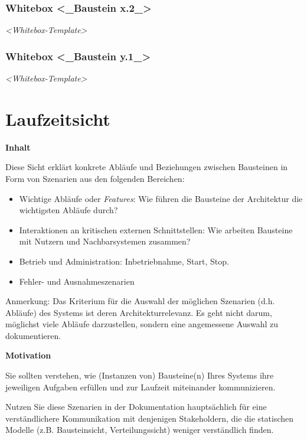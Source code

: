 \documentclass[a4paper,12pt]{article}
\begin{document}
\subsubsection{Whitebox \textless\_Baustein
x.2\_\textgreater{}}\label{_whitebox_baustein_x_2}

\emph{\textless Whitebox-Template\textgreater{}}

\subsubsection{Whitebox \textless\_Baustein
y.1\_\textgreater{}}\label{_whitebox_baustein_y_1}

\emph{\textless Whitebox-Template\textgreater{}}
\newpage
\section{Laufzeitsicht}\label{section-runtime-view}

\textbf{Inhalt}

Diese Sicht erklärt konkrete Abläufe und Beziehungen zwischen Bausteinen
in Form von Szenarien aus den folgenden Bereichen:

\begin{itemize}
\item
  Wichtige Abläufe oder \emph{Features}: Wie führen die Bausteine der
  Architektur die wichtigsten Abläufe durch?
\item
  Interaktionen an kritischen externen Schnittstellen: Wie arbeiten
  Bausteine mit Nutzern und Nachbarsystemen zusammen?
\item
  Betrieb und Administration: Inbetriebnahme, Start, Stop.
\item
  Fehler- und Ausnahmeszenarien
\end{itemize}

Anmerkung: Das Kriterium für die Auswahl der möglichen Szenarien (d.h.
Abläufe) des Systems ist deren Architekturrelevanz. Es geht nicht darum,
möglichst viele Abläufe darzustellen, sondern eine angemessene Auswahl
zu dokumentieren.

\textbf{Motivation}

Sie sollten verstehen, wie (Instanzen von) Bausteine(n) Ihres Systems
ihre jeweiligen Aufgaben erfüllen und zur Laufzeit miteinander
kommunizieren.

Nutzen Sie diese Szenarien in der Dokumentation hauptsächlich für eine
verständlichere Kommunikation mit denjenigen Stakeholdern, die die
statischen Modelle (z.B. Bausteinsicht, Verteilungssicht) weniger
verständlich finden.
\end{document}
